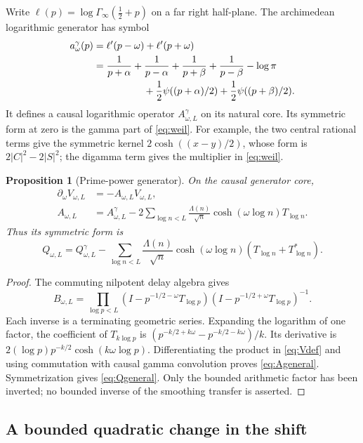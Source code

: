 \documentclass[11pt]{article}
\numberwithin{equation}{section}
\newtheorem{proposition}[theorem]{Proposition}
\theoremstyle{definition}
\theoremstyle{remark}
\newcommand{\gam}{\Gamma_\infty}
\begin{document}
Write $\ell(p)=\log\gam(\tfrac12+p)$ on a far right half-plane. The
archimedean logarithmic generator has symbol
\begin{align}
 a^\gamma_\omega(p)&=\ell'(p-\omega)+\ell'(p+\omega)\notag\\
 &=\frac1{p+\alpha}+\frac1{p-\alpha}
 +\frac1{p+\beta}+\frac1{p-\beta}-\log\pi\notag\\
 &\hspace{18mm}+\frac12\psi((p+\alpha)/2)+\frac12\psi((p+\beta)/2).
 \label{eq:agamma}
\end{align}
It defines a causal logarithmic operator $A^\gamma_{\omega,L}$ on its natural
core. Its symmetric form at zero is the gamma part of \eqref{eq:weil}.
For example, the two central rational terms give the symmetric kernel
$2\cosh((x-y)/2)$, whose form is $2|C|^2-2|S|^2$; the digamma term gives
the multiplier in \eqref{eq:weil}.

\begin{proposition}[Prime-power generator]\label{prop:generator}
On the causal generator core,
\begin{align}
 \partial_\omega V_{\omega,L}&=-A_{\omega,L}V_{\omega,L},\label{eq:derivative}\\
 A_{\omega,L}&=A^\gamma_{\omega,L}
 -2\sum_{\log n<L}\frac{\Lambda(n)}{\sqrt n}
 \cosh(\omega\log n)T_{\log n}.\label{eq:Ageneral}
\end{align}
Thus its symmetric form is
\begin{equation}\label{eq:Qgeneral}
 Q_{\omega,L}=Q^\gamma_{\omega,L}
 -\sum_{\log n<L}\frac{\Lambda(n)}{\sqrt n}
 \cosh(\omega\log n)(T_{\log n}+T_{\log n}^*).
\end{equation}
\end{proposition}
\begin{proof}
The commuting nilpotent delay algebra gives
\[
 B_{\omega,L}=\prod_{\log p<L}
 (I-p^{-1/2-\omega}T_{\log p})
 (I-p^{-1/2+\omega}T_{\log p})^{-1}.
\]
Each inverse is a terminating geometric series. Expanding the logarithm
of one factor, the coefficient of $T_{k\log p}$ is
$(p^{-k/2+k\omega}-p^{-k/2-k\omega})/k$.
Its derivative is
$2(\log p)p^{-k/2}\cosh(k\omega\log p)$.
Differentiating the product in \eqref{eq:Vdef} and using commutation with
causal gamma convolution proves \eqref{eq:Ageneral}. Symmetrization gives
\eqref{eq:Qgeneral}. Only the bounded arithmetic factor has been inverted;
no bounded inverse of the smoothing transfer is asserted.
\end{proof}

\subsection{A bounded quadratic change in the shift}
\end{document}
